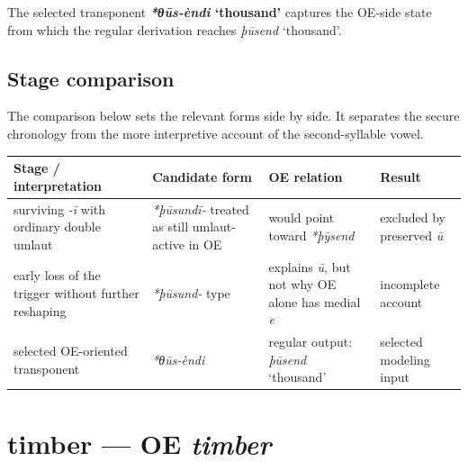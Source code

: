 \documentclass[
  british,
  a4paper,
  openany]{book}
\newcounter{none} %
\providecommand{\Recon}[1]{\emph{*#1}}
{\catcode`→=\active \global\def→{\ensuremath{\rightarrow}}}
\providecommand{\texorpdfstring}[2]{#1}
\providecommand{\Recon}[1]{\emph{*#1}}
{\catcode`→=\active \global\def→{\ensuremath{\rightarrow}}}
\begin{document}
The selected transponent \textbf{{\Recon{θūs-èndi} `thousand'}} captures
the OE-side state from which the regular derivation reaches
{\emph{þūsend}} `thousand'.

\subsection{Stage comparison}\label{stage-comparison-1}

The comparison below sets the relevant forms side by side. It separates
the secure chronology from the more interpretive account of the
second-syllable vowel.

{\def\LTcaptype{none} %
\begin{longtable}[]{@{}
  >{\raggedright\arraybackslash}p{}
  >{\raggedright\arraybackslash}p{}
  >{\raggedright\arraybackslash}p{}
  >{\raggedright\arraybackslash}p{}@{}}
\toprule\noalign{}
\begin{minipage}[b]{\linewidth}\raggedright
Stage / interpretation
\end{minipage} & \begin{minipage}[b]{\linewidth}\raggedright
Candidate form
\end{minipage} & \begin{minipage}[b]{\linewidth}\raggedright
OE relation
\end{minipage} & \begin{minipage}[b]{\linewidth}\raggedright
Result
\end{minipage} \\
\midrule\noalign{}
\endhead
\bottomrule\noalign{}
\endlastfoot
surviving \emph{-ī} with ordinary double umlaut & {\emph{*þūsundī-}}
treated as still umlaut-active in OE & would point toward
{\emph{*þȳsend}} & excluded by preserved \emph{ū} \\
early loss of the trigger without further reshaping & \emph{*þūsund-}
type & explains \emph{ū}, but not why OE alone has medial \emph{e} &
incomplete account \\
selected OE-oriented transponent & {\emph{*θūs-èndi}} & regular output:
{\emph{þūsend}} `thousand' & selected modeling input \\
\end{longtable}
}

\section{\texorpdfstring{timber --- OE
\emph{timber}}{timber --- OE timber}}\label{timber-oe-timber}
\end{document}
